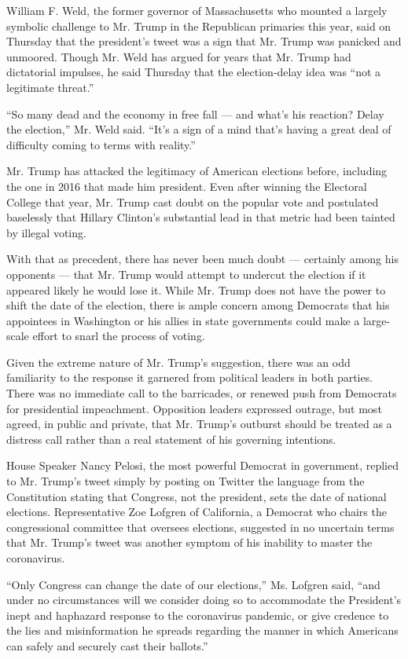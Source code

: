 William F. Weld, the former governor of Massachusetts who mounted a
largely symbolic challenge to Mr. Trump in the Republican primaries this
year, said on Thursday that the president's tweet was a sign that Mr.
Trump was panicked and unmoored. Though Mr. Weld has argued for years
that Mr. Trump had dictatorial impulses, he said Thursday that the
election-delay idea was ``not a legitimate threat.''

``So many dead and the economy in free fall --- and what's his reaction?
Delay the election,'' Mr. Weld said. ``It's a sign of a mind that's
having a great deal of difficulty coming to terms with reality.''

Mr. Trump has attacked the legitimacy of American elections before,
including the one in 2016 that made him president. Even after winning
the Electoral College that year, Mr. Trump cast doubt on the popular
vote and postulated baselessly that Hillary Clinton's substantial lead
in that metric had been tainted by illegal voting.

With that as precedent, there has never been much doubt --- certainly
among his opponents --- that Mr. Trump would attempt to undercut the
election if it appeared likely he would lose it. While Mr. Trump does
not have the power to shift the date of the election, there is ample
concern among Democrats that his appointees in Washington or his allies
in state governments could make a large-scale effort to snarl the
process of voting.

Given the extreme nature of Mr. Trump's suggestion, there was an odd
familiarity to the response it garnered from political leaders in both
parties. There was no immediate call to the barricades, or renewed push
from Democrats for presidential impeachment. Opposition leaders
expressed outrage, but most agreed, in public and private, that Mr.
Trump's outburst should be treated as a distress call rather than a real
statement of his governing intentions.

House Speaker Nancy Pelosi, the most powerful Democrat in government,
replied to Mr. Trump's tweet simply by posting on Twitter the language
from the Constitution stating that Congress, not the president, sets the
date of national elections. Representative Zoe Lofgren of California, a
Democrat who chairs the congressional committee that oversees elections,
suggested in no uncertain terms that Mr. Trump's tweet was another
symptom of his inability to master the coronavirus.

``Only Congress can change the date of our elections,'' Ms. Lofgren
said, ``and under no circumstances will we consider doing so to
accommodate the President's inept and haphazard response to the
coronavirus pandemic, or give credence to the lies and misinformation he
spreads regarding the manner in which Americans can safely and securely
cast their ballots.''

